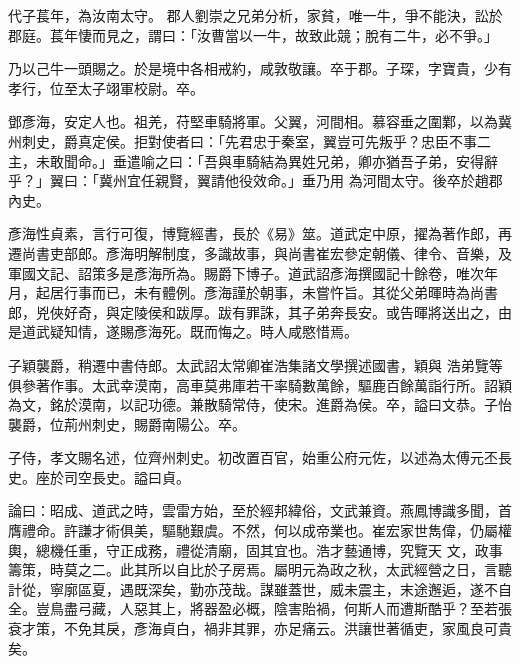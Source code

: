 \begin{pinyinscope}
 代子萇年，為汝南太守。
 郡人劉崇之兄弟分析，家貧，唯一牛，爭不能決，訟於郡庭。萇年悽而見之，謂曰：「汝曹當以一牛，故致此競；脫有二牛，必不爭。」



 乃以己牛一頭賜之。於是境中各相戒約，咸敦敬讓。卒于郡。子琛，字寶貴，少有孝行，位至太子翊軍校尉。卒。



 鄧彥海，安定人也。祖羌，苻堅車騎將軍。父翼，河間相。慕容垂之圍鄴，以為冀州刺史，爵真定侯。拒對使者曰：「先君忠于秦室，翼豈可先叛乎？忠臣不事二主，未敢聞命。」垂遣喻之曰：「吾與車騎結為異姓兄弟，卿亦猶吾子弟，安得辭乎？」翼曰：「冀州宜任親賢，翼請他役效命。」垂乃用
 為河間太守。後卒於趙郡內史。



 彥海性貞素，言行可復，博覽經書，長於《易》筮。道武定中原，擢為著作郎，再遷尚書吏部郎。彥海明解制度，多識故事，與尚書崔宏參定朝儀、律令、音樂，及軍國文記、詔策多是彥海所為。賜爵下博子。道武詔彥海撰國記十餘卷，唯次年月，起居行事而已，未有體例。彥海謹於朝事，未嘗忤旨。其從父弟暉時為尚書郎，兇俠好奇，與定陵侯和跋厚。跋有罪誅，其子弟奔長安。或告暉將送出之，由是道武疑知情，遂賜彥海死。既而悔之。時人咸愍惜焉。



 子穎襲爵，稍遷中書侍郎。太武詔太常卿崔浩集諸文學撰述國書，穎與
 浩弟覽等俱參著作事。太武幸漠南，高車莫弗庫若干率騎數萬餘，驅鹿百餘萬詣行所。詔穎為文，銘於漠南，以記功德。兼散騎常侍，使宋。進爵為侯。卒，謚曰文恭。子怡襲爵，位荊州刺史，賜爵南陽公。卒。



 子侍，孝文賜名述，位齊州刺史。初改置百官，始重公府元佐，以述為太傅元丕長史。座於司空長史。謚曰貞。



 論曰：昭成、道武之時，雲雷方始，至於經邦緯俗，文武兼資。燕鳳博識多聞，首膺禮命。許謙才術俱美，驅馳艱虞。不然，何以成帝業也。崔宏家世雋偉，仍屬權輿，總機任重，守正成務，禮從清廟，固其宜也。浩才藝通博，究覽天
 文，政事籌策，時莫之二。此其所以自比於子房焉。屬明元為政之秋，太武經營之日，言聽計從，寧廓區夏，遇既深矣，勤亦茂哉。謀雖蓋世，威未震主，末途邂逅，遂不自全。豈鳥盡弓藏，人惡其上，將器盈必概，陰害貽禍，何斯人而遭斯酷乎？至若張袞才策，不免其戾，彥海貞白，禍非其罪，亦足痛云。洪讓世著循吏，家風良可貴矣。



\end{pinyinscope}